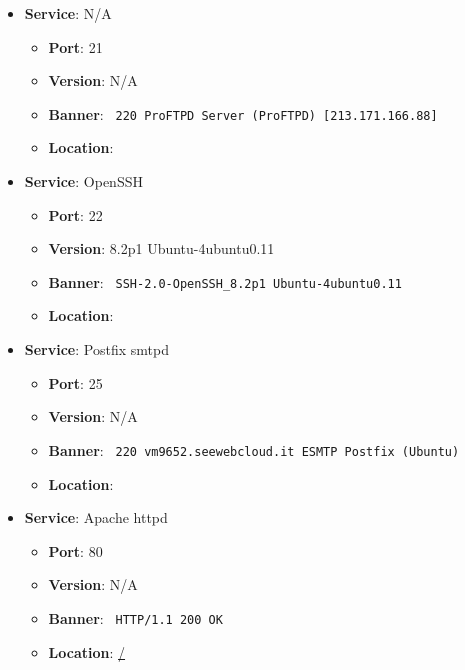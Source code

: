 \documentclass{article}
\begin{document}
\begin{itemize}
    
        \item \textbf{Service}: N/A
        \begin{itemize}
            \item \textbf{Port}: 21
            \item \textbf{Version}:  N/A 
            \item \textbf{Banner}: \texttt{
                220 ProFTPD Server (ProFTPD) [213.171.166.88]
            }
            \item \textbf{Location}: \href{  }{  }
        \end{itemize}
    
        \item \textbf{Service}: OpenSSH
        \begin{itemize}
            \item \textbf{Port}: 22
            \item \textbf{Version}:  8.2p1 Ubuntu-4ubuntu0.11 
            \item \textbf{Banner}: \texttt{
                SSH-2.0-OpenSSH\_8.2p1 Ubuntu-4ubuntu0.11
            }
            \item \textbf{Location}: \href{  }{  }
        \end{itemize}
    
        \item \textbf{Service}: Postfix smtpd
        \begin{itemize}
            \item \textbf{Port}: 25
            \item \textbf{Version}:  N/A 
            \item \textbf{Banner}: \texttt{
                220 vm9652.seewebcloud.it ESMTP Postfix (Ubuntu)
            }
            \item \textbf{Location}: \href{  }{  }
        \end{itemize}
    
        \item \textbf{Service}: Apache httpd
        \begin{itemize}
            \item \textbf{Port}: 80
            \item \textbf{Version}:  N/A 
            \item \textbf{Banner}: \texttt{
                HTTP/1.1 200 OK
            }
            \item \textbf{Location}: \href{ / }{ / }
        \end{itemize}
    

\end{itemize}
\end{document}
